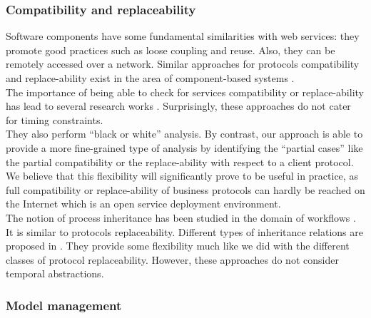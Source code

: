 
\subsubsection{Compatibility and replaceability}


Software components have some fundamental similarities with web services: they promote good practices such as loose coupling and reuse. Also, they can be remotely accessed over a network. Similar approaches for protocols compatibility and replace-ability exist in the area of component-based systems \cite{Yellin97,CCLF+06}.\\

The importance of being able to check for services compatibility or replace-ability has lead to several research works \cite{MPC-TES01,FUMK-OE05,DBACTH05}. Surprisingly, these approaches do not cater for timing constraints.\\

They also perform ``black or white'' analysis. By contrast, our approach is able to provide a more fine-grained type of analysis by identifying the ``partial cases'' like the partial compatibility or the replace-ability with respect to a client protocol. We believe that this flexibility will significantly prove to be useful in practice, as full compatibility or replace-ability of business protocols can hardly be reached on the Internet which is an open service deployment environment.\\

The notion of process inheritance has been studied in the domain of workflows \cite{aalst03inheritance,Bussler02}. It is similar to protocols replaceability. Different types of inheritance relations are proposed in \cite{aalst03inheritance}. They provide some flexibility much like we did with the different classes of protocol replaceability. However, these approaches do not consider temporal abstractions.


\subsubsection{Model management}


